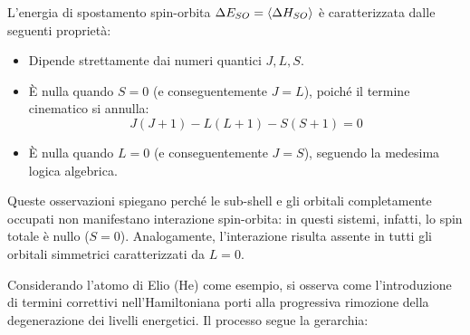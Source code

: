 L'energia di spostamento spin-orbita \(\Delta E_{SO} = \expval{\Delta H_{SO}}\) è caratterizzata dalle seguenti proprietà:
\begin{itemize}
    \item Dipende strettamente dai numeri quantici \(J, L, S\).
    \item È nulla quando \(S=0\) (e conseguentemente \(J=L\)), poiché il termine cinematico si annulla:
    \begin{equation}
        J(J+1) - L(L+1) - S(S+1) = 0
    \end{equation}
    \item È nulla quando \(L=0\) (e conseguentemente \(J=S\)), seguendo la medesima logica algebrica.
\end{itemize}

Queste osservazioni spiegano perché le sub-shell e gli orbitali completamente occupati non manifestano interazione spin-orbita: in questi sistemi, infatti, lo spin totale è nullo (\(S=0\)). Analogamente, l'interazione risulta assente in tutti gli orbitali simmetrici caratterizzati da \(L=0\).

Considerando l'atomo di Elio (He) come esempio, si osserva come l'introduzione di termini correttivi nell'Hamiltoniana porti alla progressiva rimozione della degenerazione dei livelli energetici. Il processo segue la gerarchia:

